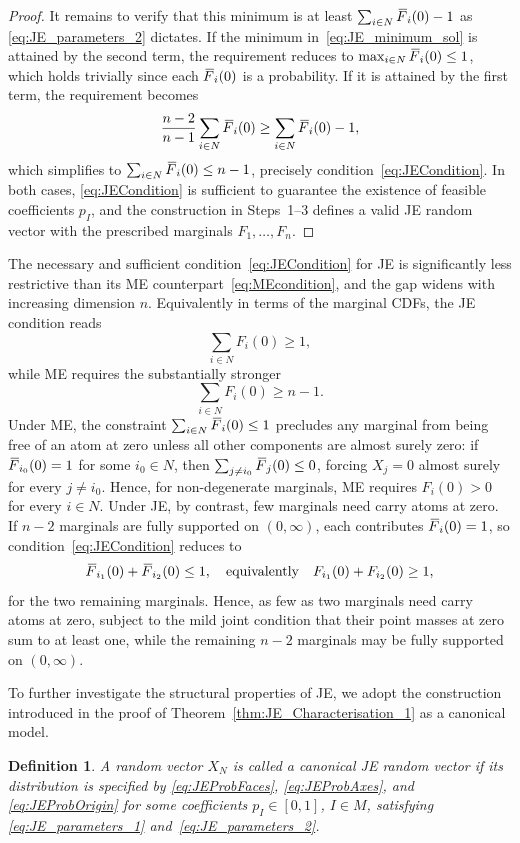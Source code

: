 \documentclass[letterpaper,12pt]{article}
\numberwithin{equation}{section}
\newtheorem{definition}[theorem]{Definition}
\newcommand{\N}{{N}}
\newcommand{\M}{{M}}
\newcommand{\I}{{I}}
\newcommand{\F}{\,\overline{\kern-0.175em F\kern-0em}}
\begin{document}
{\begin{proof}
It remains to verify that this minimum is at least $\sum_{i\in\N}\F_i(0)-1$ as \eqref{eq:JE_parameters_2} dictates.
If the minimum in~\eqref{eq:JE_minimum_sol} is attained by the second term, the
requirement reduces to $\max_{i\in\N}\F_i(0)\le 1$, which holds trivially since
each $\F_i(0)$ is a probability. If it is attained by the first term, the
requirement becomes
\[
\frac{n-2}{n-1}\sum_{i\in\N}\F_i(0)\ge\sum_{i\in\N}\F_i(0)-1,
\]
which simplifies to $\sum_{i\in\N}\F_i(0)\le n-1$, precisely
condition~\eqref{eq:JECondition}. In both cases, \eqref{eq:JECondition} is
sufficient to guarantee the existence of feasible coefficients $p_\I$, and the
construction in Steps~1--3 defines a valid JE random vector with the prescribed
marginals $F_1,\dots,F_n$.
\end{proof}


The necessary and sufficient condition~\eqref{eq:JECondition} for JE is
significantly less restrictive than its ME counterpart~\eqref{eq:MEcondition},
and the gap widens with increasing dimension $n$. Equivalently in terms of
the marginal CDFs, the JE condition reads
\[
\sum_{i\in\N} F_i(0) \ge 1,
\]
while ME requires the substantially stronger
\[
\sum_{i\in\N} F_i(0) \ge n-1.
\]
Under ME, the constraint $\sum_{i\in\N}\F_i(0)\le 1$ precludes any marginal from
being free of an atom at zero unless all other components are almost surely zero:
if $\F_{i_0}(0)=1$ for some $i_0\in\N$, then $\sum_{j\ne i_0}\F_j(0)\le0$,
forcing $X_j=0$ almost surely for every $j\ne i_0$. Hence, for non-degenerate
marginals, ME requires $F_i(0)>0$ for every $i\in\N$. Under JE, by contrast,
few marginals need carry atoms at zero. If $n-2$ marginals are fully supported on
$(0,\infty)$, each contributes $\F_i(0)=1$, so condition~\eqref{eq:JECondition}
reduces to
\[
\F_{i_1}(0)+\F_{i_2}(0)\le 1,
\quad\text{equivalently}\quad
F_{i_1}(0)+F_{i_2}(0)\ge 1,
\]
for the two remaining marginals. Hence, as few as two marginals need carry atoms
at zero, subject to the mild joint condition that their point masses at zero sum
to at least one, while the remaining $n-2$ marginals may be fully supported on
$(0,\infty)$.

\medskip

To further investigate the structural properties of JE, we adopt the construction
introduced in the proof of Theorem~\ref{thm:JE_Characterisation_1} as a canonical
model.

\begin{definition}
\label{def:JECanonical}
A random vector $X_{\N}$ is called a \emph{canonical JE random vector} if its
distribution is specified by \eqref{eq:JEProbFaces}, \eqref{eq:JEProbAxes}, and \eqref{eq:JEProbOrigin} for some coefficients $p_{\I}\in[0,1]$, $\I\in\M$, satisfying
\eqref{eq:JE_parameters_1} and~\eqref{eq:JE_parameters_2}.
\end{definition}

}
\end{document}
